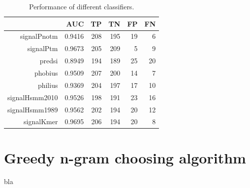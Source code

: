 \documentclass[10pt]{beamer}\usepackage[]{graphicx}\usepackage[]{color}
\begin{document}
\begin{frame}
\begin{table}[ht]
\centering
\caption{Performance of different classifiers.} 
\begin{tabular}{rrrrrr}
  \toprule
 & AUC & TP & TN & FP & FN \\ 
  \midrule
signalPnotm & 0.9416 &   208 &   195 &    19 &     6 \\ 
   \rowcolor[gray]{0.85}signalPtm & 0.9673 &   205 &   209 &     5 &     9 \\ 
  predsi & 0.8949 &   194 &   189 &    25 &    20 \\ 
   \rowcolor[gray]{0.85}phobius & 0.9509 &   207 &   200 &    14 &     7 \\ 
  philius & 0.9369 &   204 &   197 &    17 &    10 \\ 
   \rowcolor[gray]{0.85}signalHsmm2010 & 0.9526 &   198 &   191 &    23 &    16 \\ 
  signalHsmm1989 & 0.9562 &   202 &   194 &    20 &    12 \\ 
   \rowcolor[gray]{0.85}signalKmer & 0.9695 &   206 &   194 &    20 &     8 \\ 
   \bottomrule
\end{tabular}
\end{table}

\end{frame}







\section{Greedy n-gram choosing algorithm}

\begin{frame}
bla
\end{frame}
\end{document}

